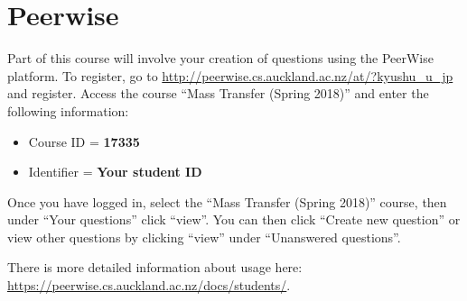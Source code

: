 \newpage
\section{Peerwise}
\label{sec:peerwise}

Part of this course will involve your creation of questions using the PeerWise platform.
To register, go to \url{http://peerwise.cs.auckland.ac.nz/at/?kyushu_u_jp} and register.
Access the course ``Mass Transfer (Spring 2018)'' and enter the following information:

\begin{itemize}
    \item Course ID = \textbf{17335}
    \item Identifier = \textbf{Your student ID}
\end{itemize}

Once you have logged in, select the ``Mass Transfer (Spring 2018)'' course, then under ``Your questions'' click ``view''. You can then click ``Create new question'' or view other questions by clicking ``view'' under ``Unanswered questions''.

There is more detailed information about usage here: \url{https://peerwise.cs.auckland.ac.nz/docs/students/}.
